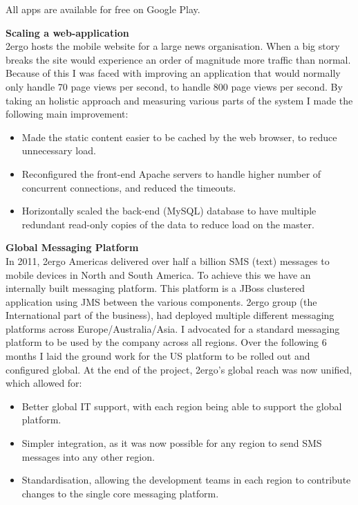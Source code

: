 \documentclass[letterpaper,10pt]{article}
\begin{document}
All apps are available for free on Google Play.

\vspace{1em}

\textbf{Scaling a web-application}\\
2ergo hosts the mobile website for a large news organisation. When a big story breaks the site would experience an order of magnitude more traffic than normal.
Because of this I was faced with improving an application that would normally only handle 70 page views per second, to handle 800 page views per second.
By taking an holistic approach and measuring various parts of the system I made the following main improvement:

 \begin{itemize}
  \item Made the static content easier to be cached by the web browser, to reduce unnecessary load.
  \item Reconfigured the front-end Apache servers to handle higher number of concurrent connections, and reduced the timeouts. 
  \item Horizontally scaled the back-end (MySQL) database to have multiple redundant read-only copies of the data to reduce load on the master.
 \end{itemize}
\vspace{1em}


\textbf{Global Messaging Platform}\\
In 2011, 2ergo Americas delivered over half a billion SMS (text) messages to mobile devices in North and South America. To achieve this we have an internally
built messaging platform. This platform is a JBoss clustered application using JMS between the various components. 2ergo group (the International part
of the business), had deployed multiple different messaging platforms across Europe/Australia/Asia. I advocated for a standard messaging platform to
be used by the company across all regions. Over the following 6 months I laid the ground work for the US platform to be rolled out and configured global. 
At the end of the project, 2ergo's global reach was now unified, which allowed for:
 \begin{itemize}
  \item Better global IT support, with each region being able to support the global platform.
  \item Simpler integration, as it was now possible for any region to send SMS messages into any other region.
  \item Standardisation, allowing the development teams in each region to contribute changes to the single core messaging platform.
 \end{itemize}
\vspace{1em}
\end{document}
